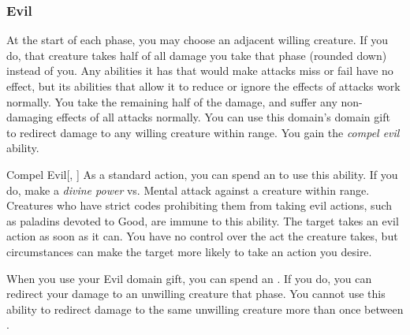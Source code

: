         \subsubsection{Evil}
             At the start of each phase, you may choose an adjacent willing creature.
            If you do, that creature takes half of all damage you take that phase (rounded down) instead of you.
            Any abilities it has that would make attacks miss or fail have no effect, but its abilities that allow it to reduce or ignore the effects of attacks work normally.
            You take the remaining half of the damage, and suffer any non-damaging effects of all attacks normally.
             You can use this domain's domain gift to redirect damage to any willing creature within \rngclose range.
             You gain the \textit{compel evil} ability.
            \begin{ability}{Compel Evil}[, ]
                As a standard action, you can spend an  to use this ability.
                If you do, make a \textit{divine power} vs. Mental attack against a creature within \rngmed range.
                Creatures who have strict codes prohibiting them from taking evil actions, such as paladins devoted to Good, are immune to this ability.
                \hit The target takes an evil action as soon as it can.
                You have no control over the act the creature takes, but circumstances can make the target more likely to take an action you desire.
            \end{ability}
             When you use your Evil domain gift, you can spend an .
            If you do, you can redirect your damage to an unwilling creature that phase.
            You cannot use this ability to redirect damage to the same unwilling creature more than once between .

